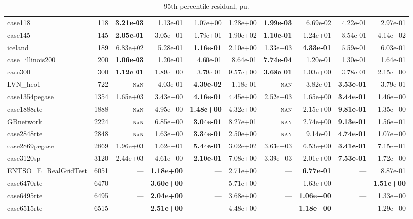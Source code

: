 \documentclass[10pt]{article}
\begin{document}
\begin{table}[H]
\begin{tabular}{lr rrrr rrrr}
case118 & 118 & \textbf{3.21e-03} & 1.13e-01 & 1.07e+00 & 1.28e+00 & \textbf{1.99e-03} & 6.69e-02 & 4.22e-01 & 2.97e-01 \\
case145 & 145 & \textbf{2.05e-01} & 3.05e+01 & 1.79e+01 & 1.90e+02 & \textbf{1.10e-01} & 1.24e+01 & 8.54e-01 & 4.14e+02 \\
iceland & 189 & 6.83e+02 & 5.28e-01 & \textbf{1.16e-01} & 2.10e+00 & 1.33e+03 & \textbf{4.33e-01} & 5.59e-01 & 6.03e-01 \\
case\_illinois200 & 200 & \textbf{1.06e-03} & 1.20e-01 & 4.60e-01 & 8.64e-01 & \textbf{7.74e-04} & 1.20e-01 & 1.30e-01 & 1.64e-01 \\
case300 & 300 & \textbf{1.12e-01} & 1.89e+00 & 3.79e-01 & 9.57e+00 & \textbf{3.68e-01} & 1.03e+00 & 3.78e-01 & 2.15e+00 \\
LVN\_heo1 & 722 & \textsc{nan} & 4.03e-01 & \textbf{4.39e-02} & 1.18e-01 & \textsc{nan} & 3.82e-01 & \textbf{3.53e-01} & 3.79e-01 \\
case1354pegase & 1354 & 1.65e+03 & 3.43e+00 & \textbf{4.16e-01} & 4.45e+00 & 2.52e+03 & 1.65e+00 & \textbf{3.44e-01} & 1.46e+00 \\
case1888rte & 1888 & \textsc{nan} & 4.95e+00 & \textbf{1.48e+00} & 4.32e+00 & \textsc{nan} & 2.15e+00 & \textbf{9.81e-01} & 1.35e+00 \\
GBnetwork & 2224 & \textsc{nan} & 6.85e+00 & \textbf{3.04e-01} & 8.27e+01 & \textsc{nan} & 2.74e+00 & \textbf{9.13e-01} & 1.56e+01 \\
case2848rte & 2848 & \textsc{nan} & 1.63e+00 & \textbf{3.34e-01} & 2.50e+00 & \textsc{nan} & 9.14e-01 & \textbf{4.74e-01} & 1.07e+00 \\
case2869pegase & 2869 & 1.96e+03 & 1.62e+01 & \textbf{5.44e-01} & 3.02e+02 & 3.63e+03 & 6.53e+00 & \textbf{3.41e-01} & 7.15e+01 \\
case3120sp & 3120 & 2.44e+03 & 4.61e+00 & \textbf{2.10e-01} & 7.08e+00 & 3.39e+03 & 2.01e+00 & \textbf{7.53e-01} & 1.72e+00 \\
ENTSO\_E\_RealGridTest & 6051 & --- & \textbf{1.18e+00} & --- & 2.71e+00 & --- & \textbf{6.77e-01} & --- & 8.87e-01 \\
case6470rte & 6470 & --- & \textbf{3.60e+00} & --- & 5.71e+00 & --- & 1.63e+00 & --- & \textbf{1.51e+00} \\
case6495rte & 6495 & --- & \textbf{2.04e+00} & --- & 3.68e+00 & --- & \textbf{1.06e+00} & --- & 1.33e+00 \\
case6515rte & 6515 & --- & \textbf{2.51e+00} & --- & 4.48e+00 & --- & \textbf{1.18e+00} & --- & 1.29e+00 \\
\bottomrule
\end{tabular}
\caption{95th-percentile residual, pu.}
\end{table}
\end{document}
